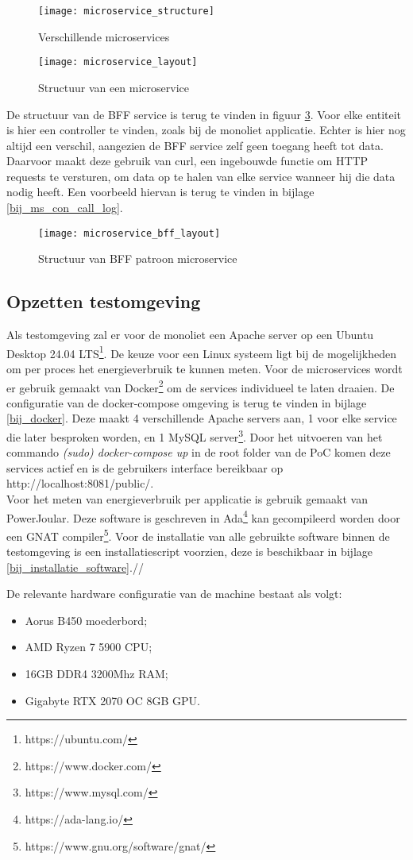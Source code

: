 \begin{figure}[h!]
    \texttt{[image: microservice\_structure]}
    \caption{Verschillende microservices}
    \label{multiple_microservices}
\end{figure}

\begin{figure}[h!]
    \texttt{[image: microservice\_layout]}
    \caption{Structuur van een microservice}
    \label{microservice_layout}
\end{figure}

De structuur van de BFF service is terug te vinden in figuur \ref{microservice_bff_layout}. Voor elke entiteit is hier een controller te vinden, zoals bij de monoliet applicatie. Echter is hier nog altijd een verschil, aangezien de BFF service zelf geen toegang heeft tot data. Daarvoor maakt deze gebruik van curl, een ingebouwde functie om HTTP requests te versturen, om data op te halen van elke service wanneer hij die data nodig heeft. Een voorbeeld hiervan is terug te vinden in bijlage \ref{bij_ms_con_call_log}.\\

\begin{figure}[h!]
    \texttt{[image: microservice\_bff\_layout]}
    \caption{Structuur van BFF patroon microservice}
    \label{microservice_bff_layout}
\end{figure}

\subsection{Opzetten testomgeving}
Als testomgeving zal er voor de monoliet een Apache server op een Ubuntu Desktop 24.04 LTS\footnote{https://ubuntu.com/}. De keuze voor een Linux systeem ligt bij de mogelijkheden om per proces het energieverbruik te kunnen meten. Voor de microservices wordt er gebruik gemaakt van Docker\footnote{https://www.docker.com/} om de services individueel te laten draaien. De configuratie van de docker-compose omgeving is terug te vinden in bijlage \ref{bij_docker}. Deze maakt 4 verschillende Apache servers aan, 1 voor elke service die later besproken worden, en 1 MySQL server\footnote{https://www.mysql.com/}. Door het uitvoeren van het commando \textit{(sudo) docker-compose up} in de root folder van de PoC komen deze services actief en is de gebruikers interface bereikbaar op http://localhost:8081/public/.\\

Voor het meten van energieverbruik per applicatie is gebruik gemaakt van PowerJoular. Deze software is geschreven in Ada\footnote{https://ada-lang.io/} kan gecompileerd worden door een GNAT compiler\footnote{https://www.gnu.org/software/gnat/}. Voor de installatie van alle gebruikte software binnen de testomgeving is een installatiescript voorzien, deze is beschikbaar in bijlage \ref{bij_installatie_software}.// %

De relevante hardware configuratie van de machine bestaat als volgt:
\begin{itemize}
    \item Aorus B450 moederbord;
    \item AMD Ryzen 7 5900 CPU;
    \item 16GB DDR4 3200Mhz RAM;
    \item Gigabyte RTX 2070 OC 8GB GPU.
\end{itemize}